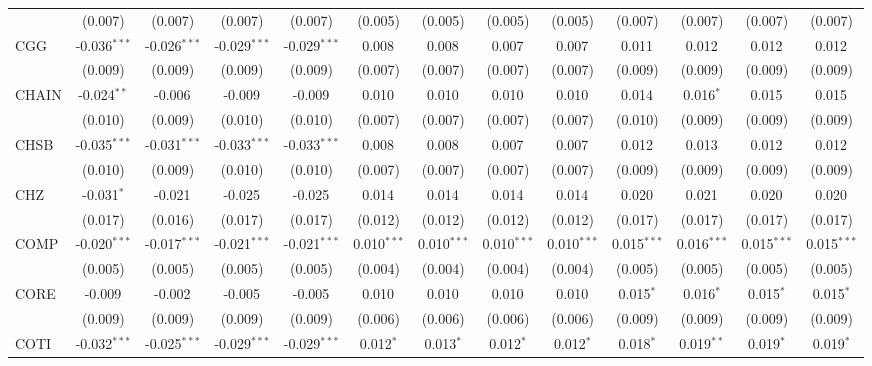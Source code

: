 \begin{table}[!htbp]
\begin{tabular}{@{\extracolsep{5pt}}lcccccccccccc}
  & (0.007) & (0.007) & (0.007) & (0.007) & (0.005) & (0.005) & (0.005) & (0.005) & (0.007) & (0.007) & (0.007) & (0.007) \\
 CGG & -0.036$^{***}$ & -0.026$^{***}$ & -0.029$^{***}$ & -0.029$^{***}$ & 0.008$^{}$ & 0.008$^{}$ & 0.007$^{}$ & 0.007$^{}$ & 0.011$^{}$ & 0.012$^{}$ & 0.012$^{}$ & 0.012$^{}$ \\
  & (0.009) & (0.009) & (0.009) & (0.009) & (0.007) & (0.007) & (0.007) & (0.007) & (0.009) & (0.009) & (0.009) & (0.009) \\
 CHAIN & -0.024$^{**}$ & -0.006$^{}$ & -0.009$^{}$ & -0.009$^{}$ & 0.010$^{}$ & 0.010$^{}$ & 0.010$^{}$ & 0.010$^{}$ & 0.014$^{}$ & 0.016$^{*}$ & 0.015$^{}$ & 0.015$^{}$ \\
  & (0.010) & (0.009) & (0.010) & (0.010) & (0.007) & (0.007) & (0.007) & (0.007) & (0.010) & (0.009) & (0.009) & (0.009) \\
 CHSB & -0.035$^{***}$ & -0.031$^{***}$ & -0.033$^{***}$ & -0.033$^{***}$ & 0.008$^{}$ & 0.008$^{}$ & 0.007$^{}$ & 0.007$^{}$ & 0.012$^{}$ & 0.013$^{}$ & 0.012$^{}$ & 0.012$^{}$ \\
  & (0.010) & (0.009) & (0.010) & (0.010) & (0.007) & (0.007) & (0.007) & (0.007) & (0.009) & (0.009) & (0.009) & (0.009) \\
 CHZ & -0.031$^{*}$ & -0.021$^{}$ & -0.025$^{}$ & -0.025$^{}$ & 0.014$^{}$ & 0.014$^{}$ & 0.014$^{}$ & 0.014$^{}$ & 0.020$^{}$ & 0.021$^{}$ & 0.020$^{}$ & 0.020$^{}$ \\
  & (0.017) & (0.016) & (0.017) & (0.017) & (0.012) & (0.012) & (0.012) & (0.012) & (0.017) & (0.017) & (0.017) & (0.017) \\
 COMP & -0.020$^{***}$ & -0.017$^{***}$ & -0.021$^{***}$ & -0.021$^{***}$ & 0.010$^{***}$ & 0.010$^{***}$ & 0.010$^{***}$ & 0.010$^{***}$ & 0.015$^{***}$ & 0.016$^{***}$ & 0.015$^{***}$ & 0.015$^{***}$ \\
  & (0.005) & (0.005) & (0.005) & (0.005) & (0.004) & (0.004) & (0.004) & (0.004) & (0.005) & (0.005) & (0.005) & (0.005) \\
 CORE & -0.009$^{}$ & -0.002$^{}$ & -0.005$^{}$ & -0.005$^{}$ & 0.010$^{}$ & 0.010$^{}$ & 0.010$^{}$ & 0.010$^{}$ & 0.015$^{*}$ & 0.016$^{*}$ & 0.015$^{*}$ & 0.015$^{*}$ \\
  & (0.009) & (0.009) & (0.009) & (0.009) & (0.006) & (0.006) & (0.006) & (0.006) & (0.009) & (0.009) & (0.009) & (0.009) \\
 COTI & -0.032$^{***}$ & -0.025$^{***}$ & -0.029$^{***}$ & -0.029$^{***}$ & 0.012$^{*}$ & 0.013$^{*}$ & 0.012$^{*}$ & 0.012$^{*}$ & 0.018$^{*}$ & 0.019$^{**}$ & 0.019$^{*}$ & 0.019$^{*}$ \\

\end{tabular}
\end{table}
